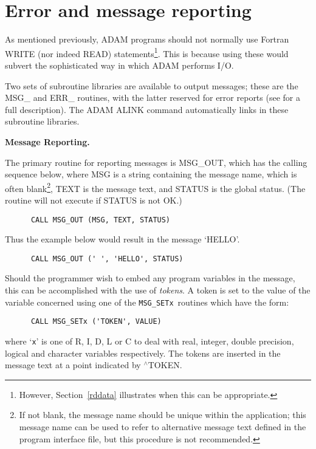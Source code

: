 \newpage
\section{Error and message reporting\label{repdim1}}

As mentioned previously, ADAM programs should not
normally use Fortran WRITE (nor indeed READ) 
statements\footnote{However, Section~\ref{rddata} illustrates when this can be 
appropriate.}.
This is because using these would subvert the sophisticated way
in which ADAM performs I/O.

Two sets of subroutine libraries are available to output
messages; these are the MSG\_  and ERR\_ routines, with the latter
reserved for error reports
(see  for a full description).
The ADAM ALINK command automatically links in these subroutine libraries.

{\bigskip\large\bf Message Reporting.}

The primary routine for reporting messages is MSG\_OUT, which has the 
calling sequence below, where MSG is a string containing the message 
name, which is often blank\footnote{If not blank, the message name should 
be unique within the application;
this message name can be used to refer to alternative message text defined 
in the program interface file, but this procedure is
not recommended.}, 
TEXT is the message text, and STATUS is the global status.
(The routine will not execute if STATUS is not OK.)
\begin{verbatim}
      CALL MSG_OUT (MSG, TEXT, STATUS) 
\end{verbatim}
Thus the example below would result in the message `HELLO'.
\begin{verbatim}
      CALL MSG_OUT (' ', 'HELLO', STATUS) 
\end{verbatim}
Should the programmer wish to embed any program variables in
the message, this can be accomplished with the use of  {\sl tokens}.
A token is set to the value of the variable concerned
using one of the {\tt MSG\_SETx}\  routines which have the form:
\begin{verbatim}      
      CALL MSG_SETx ('TOKEN', VALUE)
\end{verbatim}
where `{\tt x}' is one of R, I, D, L or
C to deal with real, integer, double precision, logical and
character variables respectively.
The tokens are inserted in the message text
at a point indicated by $^\wedge$TOKEN.

